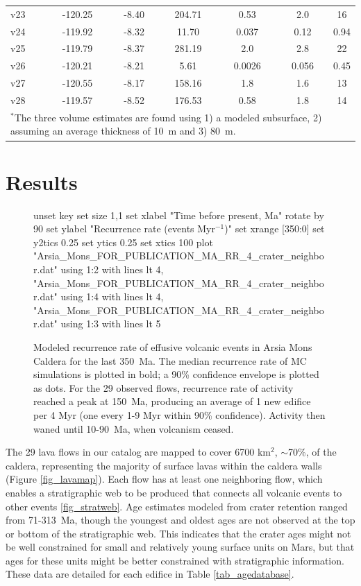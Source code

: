 \documentclass[12pt,letter]{article}
\begin{document}
\begin{table}[h!]
\begin{tabular}{l c c c c c c}
			v23 & -120.25 & -8.40 & 204.71 & 0.53 & 2.0 & 16\\
			v24 & -119.92 & -8.32 & 11.70 & 0.037 & 0.12 & 0.94\\
			v25 & -119.79 & -8.37 & 281.19 & 2.0 & 2.8 & 22\\
			v26 & -120.21 & -8.21 & 5.61 & 0.0026 & 0.056 & 0.45\\
			v27 & -120.55 & -8.17 & 158.16 & 1.8 & 1.6 & 13\\
			v28 & -119.57 & -8.52 & 176.53 & 0.58 & 1.8 & 14\\
		\bottomrule
		\multicolumn{6}{p{0.65\linewidth}}{$^*$The three volume estimates are found using 1) a modeled subsurface, 2) assuming an average thickness of 10~m and 3) 80~m.}
	\end{tabular}
	\label{tab_morphdatabase}
	\end{table}

\section{Results}

	\begin{figure}[h!]
		\centering
		\begin{gnuplot}[terminal=latex, terminaloptions=rotate]
			unset key
			set size 1,1
			set xlabel "Time before present, Ma" rotate by 90
			set ylabel "Recurrence rate (events Myr$^{-1}$)"
			set xrange [350:0]
			set y2tics 0.25
			set ytics 0.25
			set xtics 100
			plot "Arsia_Mons_FOR_PUBLICATION_MA_RR_4_crater_neighbor.dat" using 1:2 with lines lt 4, "Arsia_Mons_FOR_PUBLICATION_MA_RR_4_crater_neighbor.dat" using 1:4 with lines lt 4, "Arsia_Mons_FOR_PUBLICATION_MA_RR_4_crater_neighbor.dat" using 1:3 with lines lt 5
		\end{gnuplot}
		\caption{Modeled recurrence rate of effusive volcanic events in Arsia Mons Caldera for the last 350~Ma. The median recurrence rate of MC simulations is plotted in bold; a 90\% confidence envelope is plotted as dots. For the 29 observed flows, recurrence rate of activity reached a peak at 150~Ma, producing an average of 1 new edifice per 4 Myr (one every 1-9 Myr within 90\% confidence). Activity then waned until 10-90~Ma, when volcanism ceased.}
		\label{fig_VERRMRR}
	\end{figure}
	
The 29 lava flows in our catalog are mapped to cover 6700 km$^2$, $\sim$70\%, of the caldera, representing the majority of surface lavas within the caldera walls (Figure \ref{fig_lavamap}). Each flow has at least one neighboring flow, which enables a stratigraphic web to be produced that connects all volcanic events to other events \ref{fig_stratweb}. Age estimates modeled from crater retention ranged from 71-313~Ma, though the youngest and oldest ages are not observed at the top or bottom of the stratigraphic web. This indicates that the crater ages might not be well constrained for small and relatively young surface units on Mars, but that ages for these units might be better constrained with stratigraphic information. These data are detailed for each edifice in Table \ref{tab_agedatabase}.
	
\end{document}
